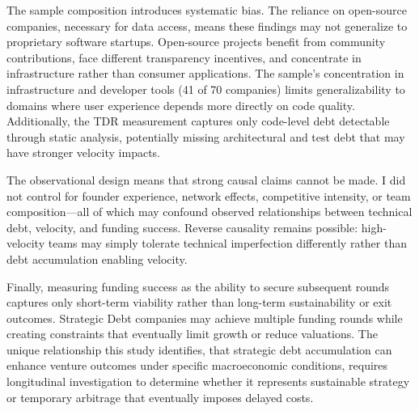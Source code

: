 The sample composition introduces systematic bias. The reliance on open-source companies, necessary for data access, means these findings may not generalize to proprietary software startups. Open-source projects benefit from community contributions, face different transparency incentives, and concentrate in infrastructure rather than consumer applications. The sample's concentration in infrastructure and developer tools (41 of 70 companies) limits generalizability to domains where user experience depends more directly on code quality. Additionally, the \ac{TDR} measurement captures only code-level debt detectable through static analysis, potentially missing architectural and test debt that may have stronger velocity impacts.

The observational design means that strong causal claims cannot be made. I did not control for founder experience, network effects, competitive intensity, or team composition—all of which may confound observed relationships between technical debt, velocity, and funding success. Reverse causality remains possible: high-velocity teams may simply tolerate technical imperfection differently rather than debt accumulation enabling velocity. 

Finally, measuring funding success as the ability to secure subsequent rounds captures only short-term viability rather than long-term sustainability or exit outcomes. Strategic Debt companies may achieve multiple funding rounds while creating constraints that eventually limit growth or reduce valuations. The unique relationship this study identifies, that strategic debt accumulation can enhance venture outcomes under specific macroeconomic conditions, requires longitudinal investigation to determine whether it represents sustainable strategy or temporary arbitrage that eventually imposes delayed costs.